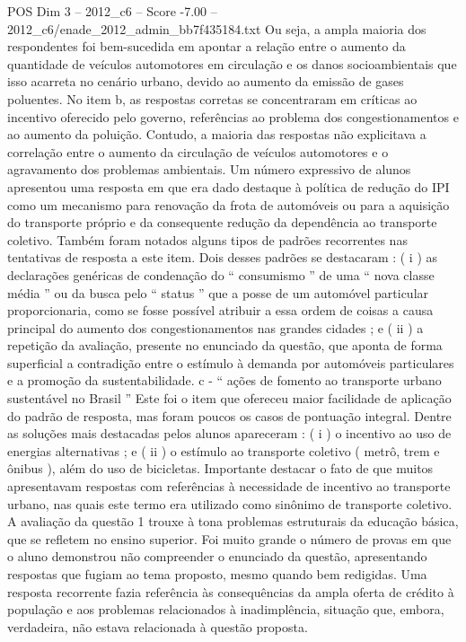 \begin{textsample}{POS Dim 3 – 2012\_c6 – Score -7.00 – 2012\_c6/enade\_2012\_admin\_bb7f435184.txt}
Ou seja, a ampla maioria dos respondentes foi bem-sucedida em apontar a relação entre o aumento da quantidade de veículos automotores em circulação e os danos socioambientais que isso acarreta no cenário urbano, devido ao aumento da emissão de gases poluentes.
No item b, as respostas corretas se concentraram em críticas ao incentivo oferecido pelo governo, referências ao problema dos congestionamentos e ao aumento da poluição.
Contudo, a maioria das respostas não explicitava a correlação entre o aumento da circulação de veículos automotores e o agravamento dos problemas ambientais.
Um número expressivo de alunos apresentou uma resposta em que era dado destaque à política de redução do IPI como um mecanismo para renovação da frota de automóveis ou para a aquisição do transporte próprio e da consequente redução da dependência ao transporte coletivo.
Também foram notados alguns tipos de padrões recorrentes nas tentativas de resposta a este item.
Dois desses padrões se destacaram : ( i ) as declarações genéricas de condenação do “ consumismo ” de uma “ nova classe média ” ou da busca pelo “ status ” que a posse de um automóvel particular proporcionaria, como se fosse possível atribuir a essa ordem de coisas a causa principal do aumento dos congestionamentos nas grandes cidades ; e ( ii ) a repetição da avaliação, presente no enunciado da questão, que aponta de forma superficial a contradição entre o estímulo à demanda por automóveis particulares e a promoção da sustentabilidade. c - “ ações de fomento ao transporte urbano sustentável no Brasil ” Este foi o item que ofereceu maior facilidade de aplicação do padrão de resposta, mas foram poucos os casos de pontuação integral.
Dentre as soluções mais destacadas pelos alunos apareceram : ( i ) o incentivo ao uso de energias alternativas ; e ( ii ) o estímulo ao transporte coletivo ( metrô, trem e ônibus ), além do uso de bicicletas.
Importante destacar o fato de que muitos apresentavam respostas com referências à necessidade de incentivo ao transporte urbano, nas quais este termo era utilizado como sinônimo de transporte coletivo.
A avaliação da questão 1 trouxe à tona problemas estruturais da educação básica, que se refletem no ensino superior.
Foi muito grande o número de provas em que o aluno demonstrou não compreender o enunciado da questão, apresentando respostas que fugiam ao tema proposto, mesmo quando bem redigidas.
Uma resposta recorrente fazia referência às consequências da ampla oferta de crédito à população e aos problemas relacionados à inadimplência, situação que, embora, verdadeira, não estava relacionada à questão proposta.

\end{textsample}
